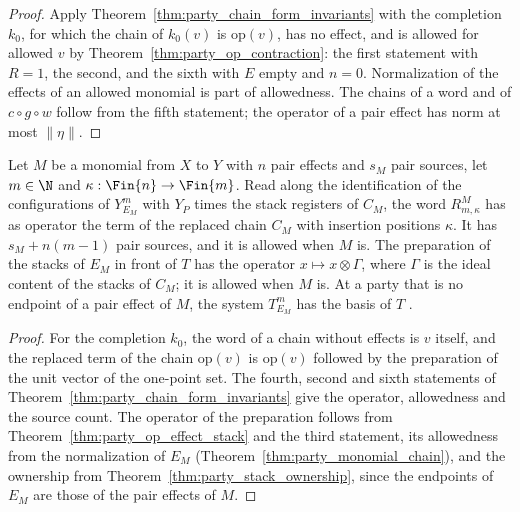 \begin{proof}\leanok
    Apply Theorem~\ref{thm:party_chain_form_invariants} with the completion $k_0$,
    for which the chain of $k_0(v)$ is $\mathrm{op}(v)$, has no effect, and is
    allowed for allowed $v$ by Theorem~\ref{thm:party_op_contraction}: the first
    statement with $R=1$, the second, and the sixth with $E$ empty and $n=0$.
    Normalization of the effects of an allowed monomial is part of allowedness.
    The chains of a word and of $c\circ g\circ w$ follow from the fifth statement;
    the operator of a pair effect has norm at most $\lVert\eta\rVert$.
\end{proof}

\begin{theorem}
    \label{thm:party_monomial_replaced_terms}
    \leanok
    Let $M$ be a monomial from $X$ to $Y$ with $n$ pair effects and $s_M$ pair
    sources, let $m\in\N$ and $\kappa:\Fin{n}\to\Fin{m}$. Read along the
    identification of the configurations of $Y^m_{E_M}$ with $Y_P$ times the stack
    registers of $C_M$, the word $R^M_{m,\kappa}$ has as operator the term of the
    replaced chain $C_M$ with insertion positions $\kappa$. It has
    $s_M+n(m-1)$ pair sources, and it is allowed when $M$ is. The preparation of the
    stacks of $E_M$ in front of $T$ has the operator $x\mapsto x\otimes\Gamma$,
    where $\Gamma$ is the ideal content of the stacks of $C_M$; it is allowed when
    $M$ is. At a party that is no endpoint of a pair effect of $M$, the system
    $T^m_{E_M}$ has the basis of $T$ \cite[Lemma~5.1]{OpenAI2026PolynomialPEPS}.
\end{theorem}

\begin{proof}\leanok
    For the completion $k_0$, the word of a chain without effects is $v$ itself, and
    the replaced term of the chain $\mathrm{op}(v)$ is $\mathrm{op}(v)$ followed by
    the preparation of the unit vector of the one-point set. The fourth, second and
    sixth statements of Theorem~\ref{thm:party_chain_form_invariants} give the
    operator, allowedness and the source count. The operator of the preparation
    follows from Theorem~\ref{thm:party_op_effect_stack} and the third statement,
    its allowedness from the normalization of $E_M$
    (Theorem~\ref{thm:party_monomial_chain}), and the ownership from
    Theorem~\ref{thm:party_stack_ownership}, since the endpoints of $E_M$ are those
    of the pair effects of $M$.
\end{proof}

